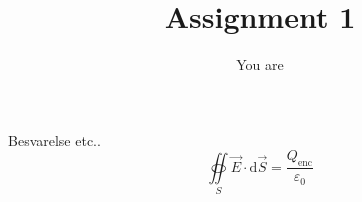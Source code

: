 \documentclass{article}
\title{Assignment 1}
\author{You are}
\institute{physics/tech}
\begin{document}
  
  Besvarelse etc..
  \[ \oiint\limits_{S}\vec E\cdot \mathrm{d}\vec{S}=\frac{Q_{\text{enc}}}{\varepsilon_0} \]
\end{document}
